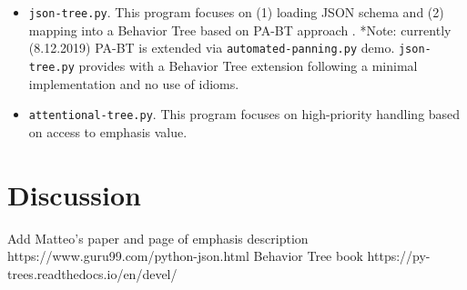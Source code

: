 \documentclass[conference]{IEEEtran}
\begin{document}
\begin{itemize}
\item \verb|json-tree.py|. This program focuses on (1) loading JSON schema and (2) mapping into a Behavior Tree based on PA-BT approach \cite{b3}.
*Note: currently (8.12.2019) PA-BT is extended via \verb|automated-panning.py| demo. \verb|json-tree.py| provides with a Behavior Tree extension following a minimal implementation and no use of idioms.


\item \verb|attentional-tree.py|. This program focuses on high-priority handling based on access to emphasis value\cite{b1}.

\end{itemize}
\section*{Discussion}




\begin{thebibliography}{00}
 Add Matteo's paper and page of emphasis description
https://www.guru99.com/python-json.html
 Behavior Tree book
 https://py-trees.readthedocs.io/en/devel/
\end{thebibliography}
\end{document}
